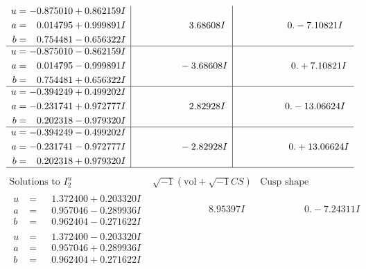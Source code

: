 \documentclass[1p]{elsarticle_modified}
\theoremstyle{definition}
\newcommand{\I}{\sqrt{-1}}
\begin{document}
$$\begin{array}{c|c|c}
\begin{aligned}
u &= -0.875010 + 0.862159 I \\
a &= \phantom{-}0.014795 + 0.999891 I \\
b &= \phantom{-}0.754481 - 0.656322 I\end{aligned}
 & \phantom{-0.000000 -}3.68608 I & \phantom{-0.000000 } 0. - 7.10821 I \\ \hline\begin{aligned}
u &= -0.875010 - 0.862159 I \\
a &= \phantom{-}0.014795 - 0.999891 I \\
b &= \phantom{-}0.754481 + 0.656322 I\end{aligned}
 & \phantom{-0.000000 } -3.68608 I & \phantom{-0.000000 -}0. + 7.10821 I \\ \hline\begin{aligned}
u &= -0.394249 + 0.499202 I \\
a &= -0.231741 + 0.972777 I \\
b &= \phantom{-}0.202318 - 0.979320 I\end{aligned}
 & \phantom{-0.000000 -}2.82928 I & \phantom{-0.000000 } 0. - 13.06624 I \\ \hline\begin{aligned}
u &= -0.394249 - 0.499202 I \\
a &= -0.231741 - 0.972777 I \\
b &= \phantom{-}0.202318 + 0.979320 I\end{aligned}
 & \phantom{-0.000000 } -2.82928 I & \phantom{-0.000000 -}0. + 13.06624 I\\
 \hline 
 \end{array}$$\newpage$$\begin{array}{c|c|c}  
\text{Solutions to }I^u_{2}& \I (\text{vol} + \sqrt{-1}CS) & \text{Cusp shape}\\
 \hline 
\begin{aligned}
u &= \phantom{-}1.372400 + 0.203320 I \\
a &= \phantom{-}0.957046 - 0.289936 I \\
b &= \phantom{-}0.962404 - 0.271622 I\end{aligned}
 & \phantom{-0.000000 -}8.95397 I & \phantom{-0.000000 } 0. - 7.24311 I \\ \hline\begin{aligned}
u &= \phantom{-}1.372400 - 0.203320 I \\
a &= \phantom{-}0.957046 + 0.289936 I \\
b &= \phantom{-}0.962404 + 0.271622 I\end{aligned}

\end{array}$$
\end{document}
